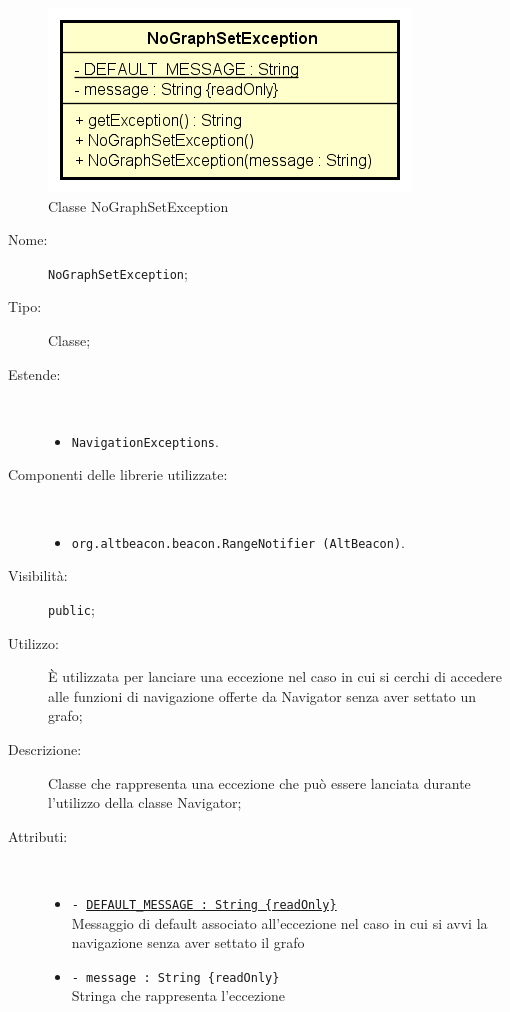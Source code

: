 \documentclass[../DefinizioneDiProdotto.tex]{subfiles}
\begin{document}
    \begin{figure}[H]
        \centering
        \includegraphics{img/NoGraphSetException.png}
        \caption{Classe NoGraphSetException}\label{fig:model::navigator::NoGraphSetException} 
    \end{figure}
    \begin{description}
\item[Nome:] \texttt{NoGraphSetException};
\item[Tipo:] Classe;
\item[Estende:] \
\begin{itemize}
\item \texttt{NavigationExceptions}.
\end{itemize}
\item[Componenti delle librerie utilizzate:] \
\begin{itemize}
\item \texttt{org.altbeacon.beacon.RangeNotifier (AltBeacon)}.

\end{itemize}
\item[Visibilità:] \texttt{public};
\item[Utilizzo:] È utilizzata per lanciare una eccezione nel caso in cui si cerchi di accedere alle funzioni di navigazione offerte da Navigator senza aver settato un grafo;
\item[Descrizione:] Classe che rappresenta una eccezione che può essere lanciata durante l'utilizzo della classe Navigator;
\item[Attributi:] \
\begin{itemize}
\item \texttt{- \underline{DEFAULT\_MESSAGE : String \{readOnly\}}}\\
Messaggio di default associato all'eccezione nel caso in cui si avvi la navigazione senza aver settato il grafo

\item \texttt{- message : String \{readOnly\}}\\
Stringa che rappresenta l'eccezione


\end{itemize}
\end{description}
\end{document}
